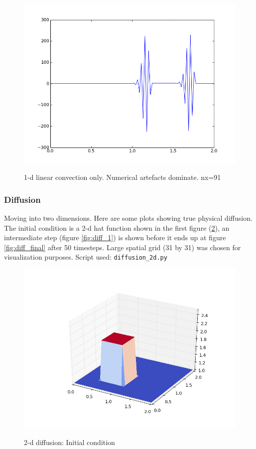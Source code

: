 \documentclass[11pt]{article}
\begin{document}
{	\begin{figure}[H]
	\centering
	\caption{1-d linear convection only. Numerical artefacts dominate. nx=91}
	\includegraphics[scale=0.8]{cfl_explode.png}
	\label{fig:num_diff_too_fine_explode}
	\end{figure}

\subsubsection{Diffusion}
Moving into two dimensions. Here are some plots showing true physical diffusion.
The initial condition is a 2-d hat function shown in the first figure (\ref{fig:diff_0}),
an intermediate step (figure \ref{fig:diff_1}) is shown before it ends up at figure
\ref{fig:diff_final} after 50 timesteps. Large spatial grid (31 by 31) was chosen
for visualization purposes. Script used: \texttt{diffusion\_2d.py}

	\begin{figure}[H]
	\centering
	\caption{2-d diffusion: Initial condition}
	\includegraphics[scale=0.8]{diff_0.png}
	\label{fig:diff_0}
	\end{figure}

}
\end{document}
